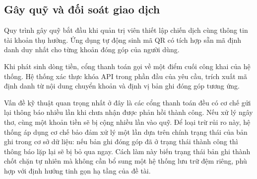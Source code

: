 \documentclass[12pt,a4paper,oneside]{report}
\begin{document}
\subsection{Gây quỹ và đối soát giao dịch}

Quy trình gây quỹ bắt đầu khi quản trị viên thiết lập chiến dịch cùng thông tin tài khoản thụ hưởng. Ứng dụng tự động sinh mã QR có tích hợp sẵn mã định danh duy nhất cho từng khoản đóng góp của người dùng.

Khi phát sinh dòng tiền, cổng thanh toán gọi về một điểm cuối công khai của hệ thống. Hệ thống xác thực khóa API trong phần đầu của yêu cầu, trích xuất mã định danh từ nội dung chuyển khoản và định vị bản ghi đóng góp tương ứng.

Vấn đề kỹ thuật quan trọng nhất ở đây là các cổng thanh toán đều có cơ chế gửi lại thông báo nhiều lần khi chưa nhận được phản hồi thành công. Nếu xử lý ngây thơ, cùng một khoản tiền sẽ bị cộng nhiều lần vào quỹ. Để loại trừ rủi ro này, hệ thống áp dụng cơ chế bảo đảm xử lý một lần dựa trên chính trạng thái của bản ghi trong cơ sở dữ liệu: nếu bản ghi đóng góp đã ở trạng thái thành công thì thông báo lặp lại sẽ bị bỏ qua ngay. Cách làm này biến trạng thái bản ghi thành chốt chặn tự nhiên mà không cần bổ sung một hệ thống lưu trữ đệm riêng, phù hợp với định hướng tinh gọn hạ tầng của đề tài.
\end{document}
